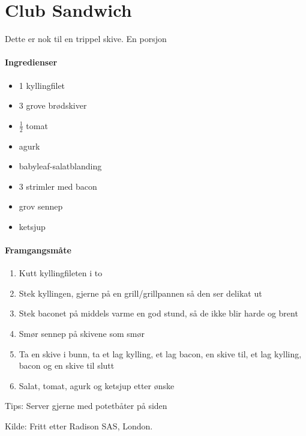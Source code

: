 \section{﻿Club Sandwich}
Dette er nok til en trippel skive. En porsjon

\paragraph{Ingredienser}
\begin{itemize}[noitemsep]
	\item 1 kyllingfilet
	\item 3 grove brødskiver
	\item $\frac{1}{2}$ tomat
	\item agurk
	\item babyleaf-salatblanding
	\item 3 strimler med bacon
	\item grov sennep
	\item ketsjup
\end{itemize}

\paragraph{Framgangsmåte}
\begin{enumerate}[noitemsep]
	\item Kutt kyllingfileten i to
	\item Stek kyllingen, gjerne på en grill/grillpannen så den ser delikat ut
	\item Stek baconet på middels varme en god stund, så de ikke blir harde og brent
	\item Smør sennep på skivene som smør
	\item Ta en skive i bunn, ta et lag kylling, et lag bacon, en skive til, et lag kylling, bacon og en skive til slutt
	\item Salat, tomat, agurk og ketsjup etter ønske
\end{enumerate}

Tips:
Server gjerne med potetbåter på siden

Kilde: Fritt etter Radison SAS, London.
